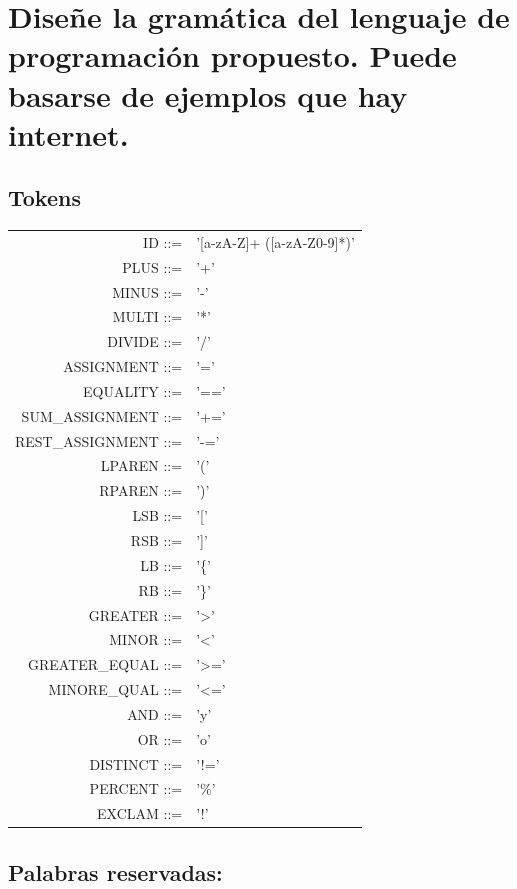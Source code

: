 
 \section{Diseñe la gramática del lenguaje de programación propuesto. Puede basarse de ejemplos que hay internet.}
 \subsection{Tokens}
\begin{center}
    \resizebox{9cm}{!} {
    \begin{tabular}{r l}
    
    ID ::=  &'[a-zA-Z]+ ([a-zA-Z0-9]*)'\\
    PLUS ::= &'+'\\
    MINUS ::= &'-'\\
    MULTI ::= &'*'\\
    DIVIDE ::= &'/'\\
    ASSIGNMENT ::= &'=' \\
    EQUALITY ::= &'=='\\
    SUM_ASSIGNMENT ::= &'+='\\
    REST_ASSIGNMENT ::= &'-='\\
    LPAREN ::= &'('\\
    RPAREN ::= &')'\\
    LSB ::= &'['\\
    RSB ::= &']'\\
    LB ::= &'\{'\\
    RB ::= &'\}'\\
    GREATER ::= &'>'\\  
    MINOR ::= &'<'  \\
    GREATER_EQUAL ::= &'>='\\  
    MINORE_QUAL ::= &'<='\\
    AND ::= &'y'\\
    OR ::= &'o'\\
    DISTINCT ::= &'!='\\
    PERCENT ::= & '\%' \\
    EXCLAM ::=&  '!'\\
    \end{tabular}
    }
\end{center}

 \subsection{Palabras reservadas:}

